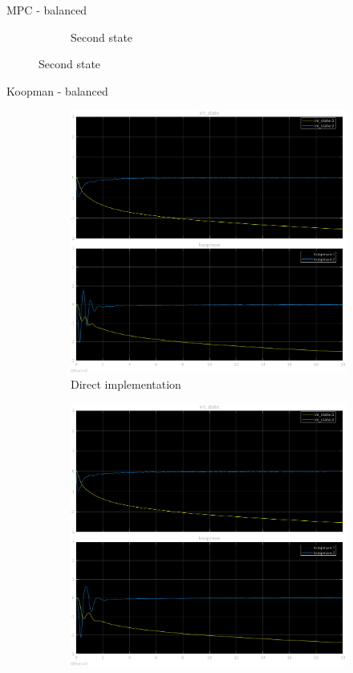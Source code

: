 \documentclass{beamer}
\begin{document}
\begin{frame}{MPC - balanced}
\begin{figure}
\begin{subfigure}[b]{0.45\textwidth}
            \caption{Second state}
        \end{subfigure}
    \end{figure}
\end{frame}

\begin{frame}{Koopman - balanced}
    \begin{figure}
        \centering
        \begin{subfigure}[b]{0.45\textwidth}
            \centering
            \includegraphics[width=\textwidth]{balanced_koopman_direct.png}
            \caption{Direct implementation}
        \end{subfigure}
        \hfill
        \begin{subfigure}[b]{0.45\textwidth}
            \centering
            \includegraphics[width=\textwidth]{balanced_koopman_differential.png}

\end{subfigure}
\end{figure}
\end{frame}
\end{document}
